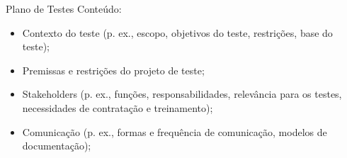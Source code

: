 
\begin{frame}{Plano de Testes}
    Conteúdo:
    \begin{itemize}
        \item Contexto do teste (p. ex., escopo, objetivos do teste, restrições, base do teste);
        \item Premissas e restrições do projeto de teste;
        \item Stakeholders (p. ex., funções, responsabilidades, relevância para os testes, necessidades de contratação e treinamento);
        \item Comunicação (p. ex., formas e frequência de comunicação, modelos de documentação);
    \end{itemize}
\end{frame}
